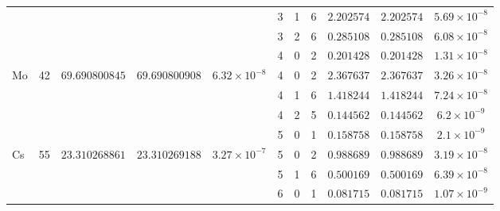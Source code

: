 \begin{table}[!htbp]
\begin{tabular}{@{}l c ccc ccc ccc@{}}
         &  &  &  &  & 3 & 1 & 6 & $2.202574$ & $2.202574$ & $5.69 \times 10^{-8}$ \\
         &  &  &  &  & 3 & 2 & 6 & $0.285108$ & $0.285108$ & $6.08 \times 10^{-8}$ \\
         &  &  &  &  & 4 & 0 & 2 & $0.201428$ & $0.201428$ & $1.31 \times 10^{-8}$ \\
        \multirow[t]{4}{*}{Mo} & \multirow[t]{4}{*}{42} & \multirow[t]{4}{*}{$69.690800845$} & \multirow[t]{4}{*}{$69.690800908$} & \multirow[t]{4}{*}{$6.32 \times 10^{-8}$} & 4 & 0 & 2 & $2.367637$ & $2.367637$ & $3.26 \times 10^{-8}$ \\
         &  &  &  &  & 4 & 1 & 6 & $1.418244$ & $1.418244$ & $7.24 \times 10^{-8}$ \\
         &  &  &  &  & 4 & 2 & 5 & $0.144562$ & $0.144562$ & $6.2 \times 10^{-9}$ \\
         &  &  &  &  & 5 & 0 & 1 & $0.158758$ & $0.158758$ & $2.1 \times 10^{-9}$ \\
        \multirow[t]{3}{*}{Cs} & \multirow[t]{3}{*}{55} & \multirow[t]{3}{*}{$23.310268861$} & \multirow[t]{3}{*}{$23.310269188$} & \multirow[t]{3}{*}{$3.27 \times 10^{-7}$} & 5 & 0 & 2 & $0.988689$ & $0.988689$ & $3.19 \times 10^{-8}$ \\
         &  &  &  &  & 5 & 1 & 6 & $0.500169$ & $0.500169$ & $6.39 \times 10^{-8}$ \\
         &  &  &  &  & 6 & 0 & 1 & $0.081715$ & $0.081715$ & $1.07 \times 10^{-9}$ \\
        \bottomrule
    \end{tabular}
\end{table}

